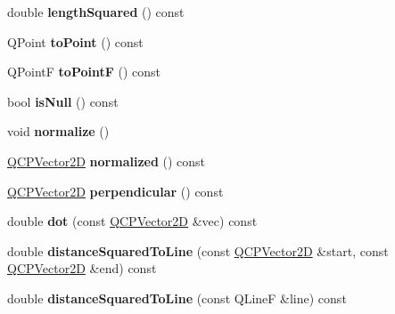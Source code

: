 \begin{DoxyCompactItemize}
double {\bfseries length\+Squared} () const
\item 
\mbox{\label{class_q_c_p_vector2_d_add3edf75de9b7bf1abc693b973b2e906}} 
Q\+Point {\bfseries to\+Point} () const
\item 
\mbox{\label{class_q_c_p_vector2_d_acd7af3f4a62833ada58be3f3021dbbac}} 
Q\+PointF {\bfseries to\+PointF} () const
\item 
\mbox{\label{class_q_c_p_vector2_d_ace99f200b347b14864808213eef16593}} 
bool {\bfseries is\+Null} () const
\item 
\mbox{\label{class_q_c_p_vector2_d_ad83268be370685c2a0630acc0fb1a425}} 
void {\bfseries normalize} ()
\item 
\mbox{\label{class_q_c_p_vector2_d_a707bb3af3b1f9331a2450ec75eaf7eb0}} 
\hyperlink{class_q_c_p_vector2_d}{Q\+C\+P\+Vector2D} {\bfseries normalized} () const
\item 
\mbox{\label{class_q_c_p_vector2_d_a0e08d09f9027784237e302e32290b001}} 
\hyperlink{class_q_c_p_vector2_d}{Q\+C\+P\+Vector2D} {\bfseries perpendicular} () const
\item 
\mbox{\label{class_q_c_p_vector2_d_a39f8d28db7dbffcca6aa63a1f1f6e176}} 
double {\bfseries dot} (const \hyperlink{class_q_c_p_vector2_d}{Q\+C\+P\+Vector2D} \&vec) const
\item 
\mbox{\label{class_q_c_p_vector2_d_a14840cd3da80cfee4eb3f8977cab89ab}} 
double {\bfseries distance\+Squared\+To\+Line} (const \hyperlink{class_q_c_p_vector2_d}{Q\+C\+P\+Vector2D} \&start, const \hyperlink{class_q_c_p_vector2_d}{Q\+C\+P\+Vector2D} \&end) const
\item 
\mbox{\label{class_q_c_p_vector2_d_a0c44ca97d46ee04feec32c1c57e70831}} 
double {\bfseries distance\+Squared\+To\+Line} (const Q\+LineF \&line) const
\item 
\mbox{\label{class_q_c_p_vector2_d_ae240b845c3744e43a5d0aa7b2bb66c19}} 

\end{DoxyCompactItemize}

